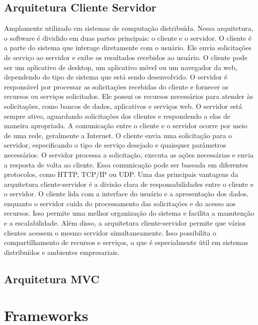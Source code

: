 \subsection{Arquitetura Cliente Servidor}
Amplamente utilizado em sistemas de computação distribuída. Nessa arquitetura, o software é dividido em duas partes principais: o cliente e o servidor.
O cliente é a parte do sistema que interage diretamente com o usuário. Ele envia solicitações de serviço ao servidor e exibe os resultados recebidos ao usuário. O cliente pode ser um aplicativo de desktop, um aplicativo móvel ou um navegador da web, dependendo do tipo de sistema que está sendo desenvolvido.
O servidor é responsável por processar as solicitações recebidas do cliente e fornecer os recursos ou serviços solicitados. Ele possui os recursos necessários para atender às solicitações, como bancos de dados, aplicativos e serviços web. O servidor está sempre ativo, aguardando solicitações dos clientes e respondendo a elas de maneira apropriada.
A comunicação entre o cliente e o servidor ocorre por meio de uma rede, geralmente a Internet. O cliente envia uma solicitação para o servidor, especificando o tipo de serviço desejado e quaisquer parâmetros necessários. O servidor processa a solicitação, executa as ações necessárias e envia a resposta de volta ao cliente. Essa comunicação pode ser baseada em diferentes protocolos, como HTTP, TCP/IP ou UDP.
Uma das principais vantagens da arquitetura cliente-servidor é a divisão clara de responsabilidades entre o cliente e o servidor. O cliente lida com a interface do usuário e a apresentação dos dados, enquanto o servidor cuida do processamento das solicitações e do acesso aos recursos. Isso permite uma melhor organização do sistema e facilita a manutenção e a escalabilidade.
Além disso, a arquitetura cliente-servidor permite que vários clientes acessem o mesmo servidor simultaneamente. Isso possibilita o compartilhamento de recursos e serviços, o que é especialmente útil em sistemas distribuídos e ambientes empresariais.

\subsection{Arquitetura MVC}

\section{Frameworks}

